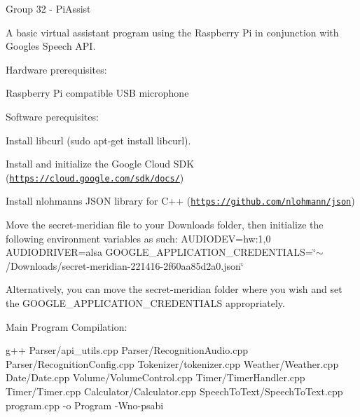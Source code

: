 Group 32 -\/ Pi\+Assist

A basic virtual assistant program using the Raspberry Pi in conjunction with Google\textquotesingle{}s Speech A\+PI.

Hardware prerequisites\+:
\begin{DoxyEnumerate}
\item Raspberry Pi compatible U\+SB microphone
\end{DoxyEnumerate}

Software perequisites\+:
\begin{DoxyEnumerate}
\item Install libcurl (sudo apt-\/get install libcurl).
\item Install and initialize the Google Cloud S\+DK (\href{https://cloud.google.com/sdk/docs/}{\tt https\+://cloud.\+google.\+com/sdk/docs/})
\item Install nlohmann\textquotesingle{}s J\+S\+ON library for C++ (\href{https://github.com/nlohmann/json}{\tt https\+://github.\+com/nlohmann/json})
\item Move the secret-\/meridian file to your Downloads folder, then initialize the following environment variables as such\+: A\+U\+D\+I\+O\+D\+EV=hw\+:1,0 A\+U\+D\+I\+O\+D\+R\+I\+V\+ER=alsa G\+O\+O\+G\+L\+E\+\_\+\+A\+P\+P\+L\+I\+C\+A\+T\+I\+O\+N\+\_\+\+C\+R\+E\+D\+E\+N\+T\+I\+A\+LS=\char`\"{}$\sim$/\+Downloads/secret-\/meridian-\/221416-\/2f60aa85d2a0.\+json\char`\"{}
\end{DoxyEnumerate}

Alternatively, you can move the secret-\/meridian folder where you wish and set the G\+O\+O\+G\+L\+E\+\_\+\+A\+P\+P\+L\+I\+C\+A\+T\+I\+O\+N\+\_\+\+C\+R\+E\+D\+E\+N\+T\+I\+A\+LS appropriately.

Main Program Compilation\+:

g++ Parser/api\+\_\+utils.\+cpp Parser/\+Recognition\+Audio.\+cpp Parser/\+Recognition\+Config.\+cpp Tokenizer/tokenizer.\+cpp Weather/\+Weather.\+cpp Date/\+Date.\+cpp Volume/\+Volume\+Control.\+cpp Timer/\+Timer\+Handler.\+cpp Timer/\+Timer.\+cpp Calculator/\+Calculator.\+cpp Speech\+To\+Text/\+Speech\+To\+Text.\+cpp program.\+cpp -\/o Program -\/\+Wno-\/psabi 
